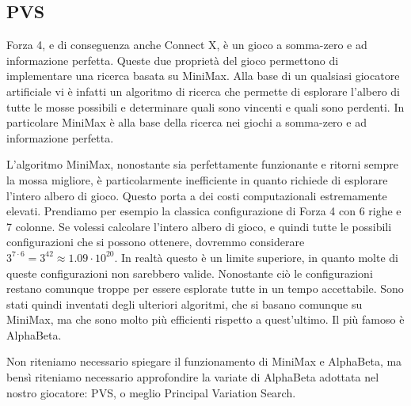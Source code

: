 \documentclass[a4paper]{article}
\begin{document}
\subsection{PVS}
Forza 4, e di conseguenza anche Connect X, è un gioco a somma-zero e ad 
informazione perfetta. Queste due proprietà del gioco permettono di implementare
una ricerca basata su MiniMax. Alla base di un qualsiasi giocatore artificiale
vi è infatti un algoritmo di ricerca che permette di esplorare l'albero di tutte
le mosse possibili e determinare quali sono vincenti e quali sono perdenti. In
particolare MiniMax è alla base della ricerca nei giochi a somma-zero e ad 
informazione perfetta.

L'algoritmo MiniMax, nonostante sia perfettamente funzionante e ritorni sempre
la mossa migliore, è particolarmente inefficiente in quanto richiede di 
esplorare l'intero albero di gioco. Questo porta a dei costi computazionali 
estremamente elevati. Prendiamo per esempio la classica configurazione di Forza 
4 con 6 righe e 7 colonne. Se volessi calcolare l'intero albero di gioco, e 
quindi tutte le possibili configurazioni che si possono ottenere, dovremmo 
considerare $3^{7 \cdot 6} = 3^{42} \approx 1.09 \cdot 10^{20}$. In realtà 
questo è un limite superiore, in quanto molte di queste configurazioni non 
sarebbero valide. Nonostante ciò le configurazioni restano comunque troppe per
essere esplorate tutte in un tempo accettabile. Sono stati quindi inventati 
degli ulteriori algoritmi, che si basano comunque su MiniMax, ma che sono molto 
più efficienti rispetto a quest'ultimo. Il più famoso è AlphaBeta.

Non riteniamo necessario spiegare il funzionamento di MiniMax e AlphaBeta, ma 
bensì riteniamo necessario approfondire la variate di AlphaBeta adottata nel 
nostro giocatore: PVS, o meglio Principal Variation Search.
\end{document}
